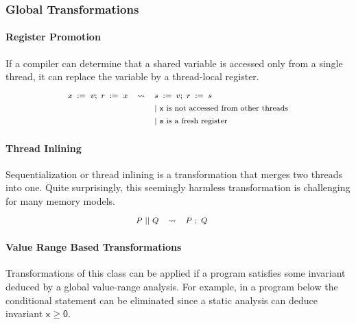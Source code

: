 \subsubsection{Global Transformations}

\paragraph{Register Promotion}

If a compiler can determine that a shared variable 
is accessed only from a single thread, it can replace 
the variable by a thread-local register. 
%
\[\def\arraystretch{1.4}\footnotesize
  \begin{array}{ccl} 

      \writeInst{}{x}{v} \seq \readInst{}{r}{x} 
    & \leadsto 
    & \assignInst{s}{v} \seq \assignInst{r}{s}
    \\ 
    
    & & |~ \text{\texttt{x} is not accessed from other threads} \\
    & & |~ \text{\texttt{s} is a fresh register} \\ 

  \end{array}
\]

\paragraph{Thread Inlining}

Sequentialization or thread inlining 
is a transformation that merges two threads into one.
Quite surprisingly, this seemingly harmless transformation
is challenging for many memory models. 
%
\[\def\arraystretch{1.4}\footnotesize
  \begin{array}{cccl} 

      P \pll Q 
    & \leadsto 
    & P ~\seq Q
    & ~ \\ 
    
  \end{array}
\]


\paragraph{Value Range Based Transformations}

Transformations of this class can be applied 
if a program satisfies some invariant deduced 
by a global value-range analysis. 
For example, in a program below   
the conditional statement can be eliminated 
since a static analysis can deduce invariant 
$\mathsf{x} \geq \mathsf{0}$.

